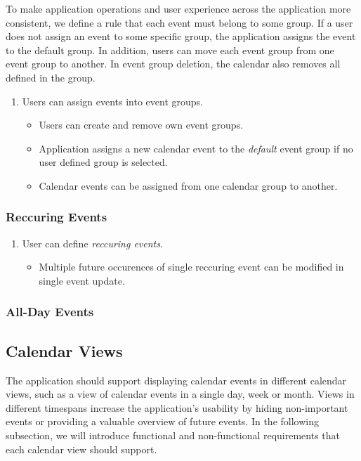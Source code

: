 To make application operations and user experience across the application more consistent, we define a rule that each event must belong to some group. If a user does not assign an event to some specific group, the application assigns the event to the default group. In addition, users can move each event group from one event group to another. In event group deletion, the calendar also removes all defined in the group.

\begin{enumerate}[label=\color{reqcolor}\textbf{R{\arabic*}}, resume]
    \item \label{app:req:groups1} Users can assign events into event groups.
        \begin{itemize}
            \item Users can create and remove own event groups.
            \item Application assigns a new calendar event to the \textit{default} event group if no user defined group is selected.
            \item Calendar events can be assigned from one calendar group to another.
        \end{itemize}
\end{enumerate}

\subsubsection*{Reccuring Events}



\begin{enumerate}[label=\color{reqcolor}\textbf{R{\arabic*}}, resume]
    \item \label{app:req:events4} User can define \textit{reccuring events}.
        \begin{itemize}
            \item Multiple future occurences of single reccuring event can be modified in single event update.
        \end{itemize}
\end{enumerate}

\subsubsection*{All-Day Events}

\subsection*{Calendar Views}
The application should support displaying calendar events in different calendar views, such as a view of calendar events in a single day, week or month. Views in different timespans increase the application's usability by hiding non-important events or providing a valuable overview of future events.
In the following subsection, we will introduce functional and non-functional requirements that each calendar view should support.

